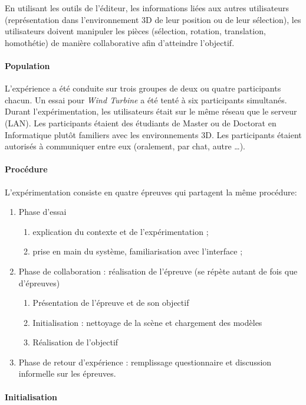 En utilisant les outils de l'éditeur, les informations liées aux autres utilisateurs 
(représentation dans l'environnement 3D de leur position ou de leur sélection), les 
utilisateurs doivent manipuler les pièces (sélection, rotation, translation, 
homothétie) de manière collaborative afin d'atteindre l'objectif. 
\paragraph{Population}
L'expérience a été conduite sur trois groupes de deux ou quatre participants 
chacun. Un essai pour \textit{Wind Turbine} a été tenté à six participants 
simultanés.
Durant l'expérimentation, les utilisateurs était sur le même réseau que le serveur 
(\gls{LAN}). 
Les participants étaient des étudiants de Master ou de Doctorat en Informatique 
plutôt familiers avec les environnements 3D. Les participants étaient autorisés à 
communiquer entre eux (oralement, par chat, autre \dots).
\paragraph{Procédure}
L'expérimentation consiste en quatre épreuves qui partagent la même procédure:
\begin{enumerate}
	\item Phase d'essai 
	\begin{enumerate}
		\item explication du contexte et de l'expérimentation ;
		\item prise en main du système, familiarisation avec 
		l'interface ;
	\end{enumerate}
	\item Phase de collaboration : réalisation de l'épreuve (se répète autant de fois 
	que d'épreuves)
	\begin{enumerate}
		\item Présentation de l'épreuve et de son objectif
		\item Initialisation : nettoyage de la scène et chargement des modèles
		\item Réalisation de l'objectif
	\end{enumerate}
	\item Phase de retour d'expérience : remplissage questionnaire et discussion 
	informelle sur les épreuves.
\end{enumerate}

\paragraph{Initialisation}

